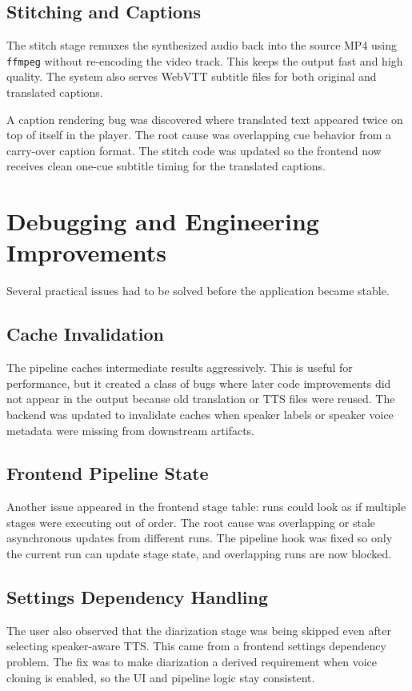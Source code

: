 \documentclass[11pt]{article}
\begin{document}
\subsection{Stitching and Captions}
The stitch stage remuxes the synthesized audio back into the source MP4 using
\texttt{ffmpeg} without re-encoding the video track. This keeps the output
fast and high quality. The system also serves WebVTT subtitle files for both
original and translated captions.

A caption rendering bug was discovered where translated text appeared twice on
top of itself in the player. The root cause was overlapping cue behavior from a
carry-over caption format. The stitch code was updated so the frontend now
receives clean one-cue subtitle timing for the translated captions.

\section{Debugging and Engineering Improvements}
Several practical issues had to be solved before the application became stable.

\subsection{Cache Invalidation}
The pipeline caches intermediate results aggressively. This is useful for
performance, but it created a class of bugs where later code improvements did
not appear in the output because old translation or TTS files were reused. The
backend was updated to invalidate caches when speaker labels or speaker voice
metadata were missing from downstream artifacts.

\subsection{Frontend Pipeline State}
Another issue appeared in the frontend stage table: runs could look as if
multiple stages were executing out of order. The root cause was overlapping or
stale asynchronous updates from different runs. The pipeline hook was fixed so
only the current run can update stage state, and overlapping runs are now
blocked.

\subsection{Settings Dependency Handling}
The user also observed that the diarization stage was being skipped even after
selecting speaker-aware TTS. This came from a frontend settings dependency
problem. The fix was to make diarization a derived requirement when voice
cloning is enabled, so the UI and pipeline logic stay consistent.
\end{document}
